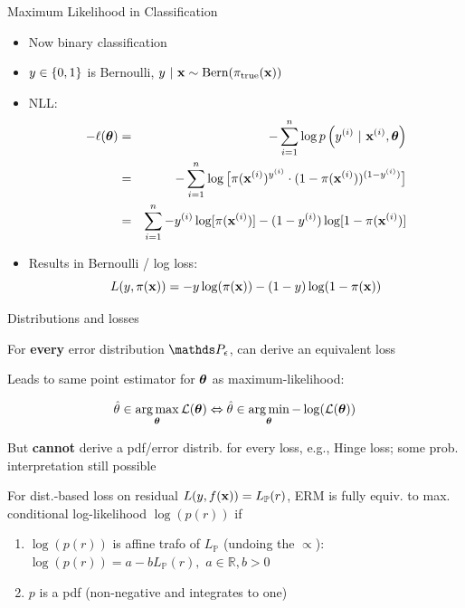 \documentclass[11pt,compress,t,notes=noshow, xcolor=table]{beamer}
\begin{document}
\begin{vbframe}{Maximum Likelihood in Classification}


\begin{itemize}

\item Now binary classification
\item $y \in \{0, 1\}$ is Bernoulli, $y ~|~ \mathbf{x} \sim \text{Bern}(\pi_\text{true}(\mathbf{x}))$
\item  NLL:
\begin{eqnarray*}
- \ell(\bm{\theta}) &=& -\sum\limits_{i=1}^n \log p\left(y^{(i)} ~|~\mathbf{x}^{(i)}, \bm{\theta}\right) \\ 
&=& - \sum\limits_{i=1}^n \log \big[\pi(\mathbf{x}^{(i)})^{y^{(i)}} \cdot (1 - \pi(\mathbf{x}^{(i)}))^{(1 - y^{(i)})} \big]\\
&=& \sum\limits_{i=1}^n -y^{(i)} \log[\pi(\mathbf{x}^{(i)})] - (1-y^{(i)}) \log [1 - \pi(\mathbf{x}^{(i)})]
\end{eqnarray*}
\item Results in Bernoulli / log loss:
$$
  L(y, \pi(\mathbf{x})) = -y\log(\pi(\mathbf{x}))-(1-y)\log(1-\pi(\mathbf{x}))
$$


\end{itemize}

\end{vbframe}




\begin{vbframe}{Distributions and losses}

\begin{itemizeL}

\item For \textbf{every} error distribution $\P_\eps$, can derive an equivalent loss
\item Leads to same point estimator for $\bm{\theta}$ as maximum-likelihood:

$$
\hat{\theta} \in \mathop{\mathrm{arg\,max}}_{\bm{\theta}} \mathcal{L}(\bm{\theta}) \Leftrightarrow \hat{\theta} \in \mathop{\mathrm{arg\,min}}_{\bm{\theta}}-\log(\mathcal{L}(\bm{\theta}))
$$
    
\item But \textbf{cannot} derive a pdf/error distrib. for every loss, e.g., Hinge loss; some prob. interpretation still possible 

\item For dist.-based loss on residual $L(y,f(\mathbf{x}))=L_{\mathbb{P}}(r)$, ERM is fully equiv. to max. conditional log-likelihood $\log(p(r))$ if
\begin{enumerate}
    \item $\log(p(r))$ is affine trafo of $L_{\mathbb{P}}$ (undoing the $\propto$):
    $\log(p(r)) = a - bL_{\mathbb{P}}(r),\,\,a \in \mathbb{R}, b>0$
    \item  $p$ is a pdf (non-negative and integrates to one)
\end{enumerate}


\end{itemizeL}


\end{vbframe}


\endlecture
\end{document}
